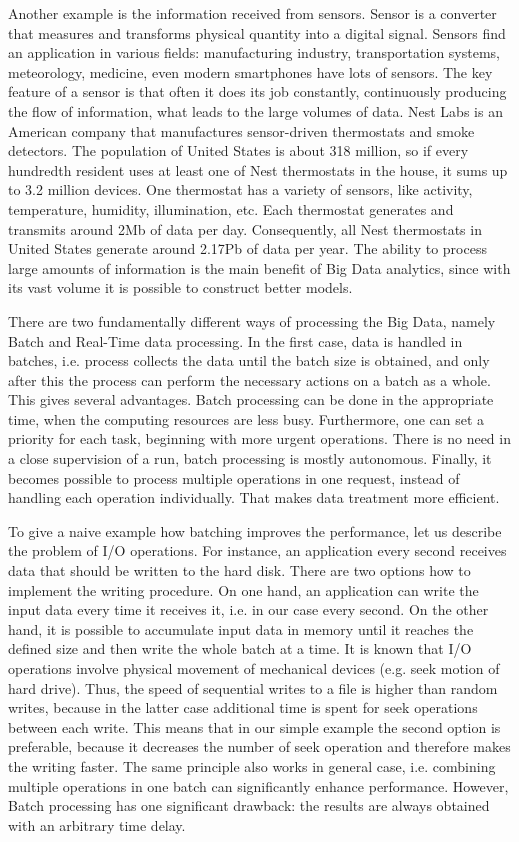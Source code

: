 Another example is the information received from sensors.
Sensor is a converter that measures and transforms physical quantity into a digital signal.
Sensors find an application in various fields: manufacturing industry, transportation systems, meteorology, medicine, even modern smartphones have lots of sensors.
The key feature of a sensor is that often it does its job constantly, continuously producing the flow of information, what leads to the large volumes of data.
Nest Labs is an American company that manufactures sensor-driven thermostats and smoke detectors.
The population of United States is about 318 million, so if every hundredth resident uses at least one of Nest thermostats in the house, it sums up to 3.2 million devices.
One thermostat has a variety of sensors, like activity, temperature, humidity, illumination, etc.
Each thermostat generates and transmits around 2Mb of data per day.
Consequently, all Nest thermostats in United States generate around 2.17Pb of data per year. 
The ability to process large amounts of information is the main benefit of Big Data analytics, since with its vast volume it is possible to construct better models.

There are two fundamentally different ways of processing the Big Data, namely Batch and Real-Time data processing.
In the first case, data is handled in batches, i.e. process collects the data until the batch size is obtained, and only after this the process can perform the necessary actions on a batch as a whole.
This gives several advantages.
Batch processing can be done in the appropriate time, when the computing resources are less busy.
Furthermore, one can set a priority for each task, beginning with more urgent operations.
There is no need in a close supervision of a run, batch processing is mostly autonomous.
Finally, it becomes possible to process multiple operations in one request, instead of handling each operation individually.
That makes data treatment more efficient. 

To give a naive example how batching improves the performance, let us describe the problem of I/O operations.
For instance, an application every second receives data that should be written to the hard disk. 
There are two options how to implement the writing procedure.
On one hand, an application can write the input data every time it receives it, i.e. in our case every second.
On the other hand, it is possible to accumulate input data in memory until it reaches the defined size and then write the whole batch at a time.
It is known that I/O operations involve physical movement of mechanical devices (e.g. seek motion of hard drive).
Thus, the speed of sequential writes to a file is higher than random writes, because in the latter case additional time is spent for seek operations between each write.
This means that in our simple example the second option is preferable, because it decreases the number of seek operation and therefore makes the writing faster.    
The same principle also works in general case, i.e. combining multiple operations in one batch can significantly enhance performance.
However, Batch processing has one significant drawback: the results are always obtained with an arbitrary time delay.

